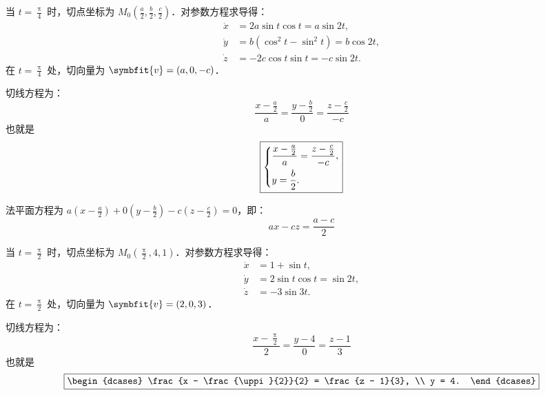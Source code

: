 \begin{solution}
    当 $t = \frac{\uppi}{4}$ 时，切点坐标为 $M_0 \left( \frac{a}{2}, \frac{b}{2}, \frac{c}{2} \right)$．对参数方程求导得：
    \begin{equation}
        \begin{aligned}
            \dot{x} & = 2a \sin t \cos t = a \sin 2t,       \\
            \dot{y} & = b(\cos^2 t - \sin^2 t) = b \cos 2t, \\
            \dot{z} & = -2c \cos t \sin t = -c \sin 2t.
        \end{aligned}
    \end{equation}
    在 $t = \frac{\uppi}{4}$ 处，切向量为 $\symbfit{v} = (a, 0, -c)$．

    切线方程为：
    \begin{equation}
        \boxed{\frac{x - \frac{a}{2}}{a} = \frac{y - \frac{b}{2}}{0} = \frac{z - \frac{c}{2}}{-c}}
    \end{equation}
    也就是
    \begin{equation}
        \boxed{
            \begin{dcases}
                \frac{x - \frac{a}{2}}{a} = \frac{z - \frac{c}{2}}{-c},
                \\ y = \frac{b}{2}.
            \end{dcases}
        }
    \end{equation}

    法平面方程为 $a\left(x - \frac{a}{2}\right) + 0\left(y - \frac{b}{2}\right) - c\left(z - \frac{c}{2}\right) = 0$，即：
    \begin{equation}
        \boxed{ax - cz = \frac{a - c}{2}}
    \end{equation}

    当 $t = \frac{\uppi}{2}$ 时，切点坐标为 $M_0 \left( \frac{\uppi}{2}, 4, 1 \right)$．对参数方程求导得：
    \begin{equation}
        \begin{aligned}
            \dot{x} & = 1 + \sin t,                \\
            \dot{y} & = 2 \sin t \cos t = \sin 2t, \\
            \dot{z} & = -3 \sin 3t.
        \end{aligned}
    \end{equation}
    在 $t = \frac{\uppi}{2}$ 处，切向量为 $\symbfit{v} = (2, 0, 3)$．

    切线方程为：
    \begin{equation}
        \boxed{\frac{x - \frac{\uppi}{2}}{2} = \frac{y - 4}{0} = \frac{z - 1}{3}}
    \end{equation}
    也就是
    \begin{equation}
        \boxed{
            \begin{dcases}
                \frac{x - \frac{\uppi}{2}}{2} = \frac{z - 1}{3},
                \\ y = 4.
            \end{dcases}
        }
    \end{equation}


\end{solution}
